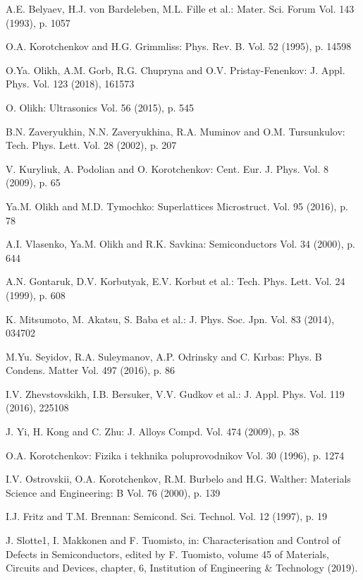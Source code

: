 \documentclass{ttp}
\begin{document}
\begin{thebibliography}{99}
 A.E. Belyaev, H.J. von Bardeleben, M.L. Fille et al.: Mater. Sci. Forum Vol. 143 (1993), p. 1057

 O.A. Korotchenkov and H.G. Grimmliss: Phys. Rev. B. Vol. 52 (1995), p. 14598

  O.Ya. Olikh, A.M. Gorb, R.G. Chupryna and O.V. Pristay-Fenenkov: J. Appl. Phys. Vol. 123 (2018), 161573

 O. Olikh: Ultrasonics Vol. 56 (2015), p. 545

 B.N. Zaveryukhin, N.N. Zaveryukhina, R.A. Muminov and O.M. Tursunkulov: Tech. Phys. Lett. Vol. 28 (2002), p. 207

 V. Kuryliuk, A. Podolian and O. Korotchenkov: Cent. Eur. J. Phys. Vol. 8 (2009), p. 65

 Ya.M. Olikh and M.D. Tymochko: Superlattices Microstruct. Vol. 95 (2016), p. 78

 A.I. Vlasenko,  Ya.M. Olikh  and R.K. Savkina: Semiconductors Vol. 34 (2000), p. 644

 A.N. Gontaruk,  D.V. Korbutyak, E.V. Korbut et al.: Tech. Phys. Lett. Vol. 24 (1999), p. 608

 K. Mitsumoto, M. Akatsu, S. Baba et al.: J. Phys. Soc. Jpn. Vol. 83 (2014), 034702

 M.Yu. Seyidov, R.A. Suleymanov, A.P. Odrinsky and C. Kırbas: Phys. B Condens. Matter Vol. 497 (2016), p. 86

 I.V. Zhevstovskikh, I.B. Bersuker, V.V. Gudkov et al.: J. Appl. Phys. Vol. 119 (2016), 225108

 J. Yi, H. Kong and C. Zhu: J. Alloys Compd. Vol. 474 (2009), p. 38

 O.A. Korotchenkov: Fizika i tekhnika poluprovodnikov Vol. 30 (1996), p. 1274

 I.V. Ostrovskii, O.A. Korotchenkov, R.M. Burbelo and H.G. Walther: Materials Science and Engineering: B Vol. 76 (2000), p. 139

 I.J. Fritz and T.M. Brennan: Semicond. Sci. Technol. Vol. 12 (1997), p. 19

 J. Slotte1, I. Makkonen and F. Tuomisto, in: Characterisation and Control of Defects
in Semiconductors, edited by F. Tuomisto, volume 45 of Materials, Circuits and Devices, chapter,
6, Institution of Engineering \& Technology (2019).


\end{thebibliography}
\end{document}
